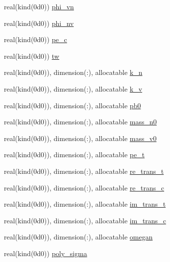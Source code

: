\begin{Indent}
\begin{DoxyCompactItemize}
real(kind(0d0)) \hyperlink{namespacem__global__parameters_acc6771df62005731bbec282b0c9a5659}{phi\+\_\+vn}
\item 
real(kind(0d0)) \hyperlink{namespacem__global__parameters_a7dbd1ec1fd1ece4e997a825fa07785eb}{phi\+\_\+nv}
\item 
real(kind(0d0)) \hyperlink{namespacem__global__parameters_ac1375e5145e018847d9025e83e58b49d}{pe\+\_\+c}
\item 
real(kind(0d0)) \hyperlink{namespacem__global__parameters_aa77b0836fe22478b69e10e656ef7fcc2}{tw}
\item 
real(kind(0d0)), dimension(\+:), allocatable \hyperlink{namespacem__global__parameters_a555eda1318a218d37d1bdd8f4d57eaf2}{k\+\_\+n}
\item 
real(kind(0d0)), dimension(\+:), allocatable \hyperlink{namespacem__global__parameters_a1943ea5a5127e94a197afae57be95758}{k\+\_\+v}
\item 
real(kind(0d0)), dimension(\+:), allocatable \hyperlink{namespacem__global__parameters_a1097b95561b65a9035e5f9218de577f9}{pb0}
\item 
real(kind(0d0)), dimension(\+:), allocatable \hyperlink{namespacem__global__parameters_ae3701f74c9487c9e56c2a11fb6a52e40}{mass\+\_\+n0}
\item 
real(kind(0d0)), dimension(\+:), allocatable \hyperlink{namespacem__global__parameters_a6a06981be6cdab78452a106009022aa4}{mass\+\_\+v0}
\item 
real(kind(0d0)), dimension(\+:), allocatable \hyperlink{namespacem__global__parameters_a8a75928178eef1550c6a0389ff12b44a}{pe\+\_\+t}
\item 
real(kind(0d0)), dimension(\+:), allocatable \hyperlink{namespacem__global__parameters_ae0e61a10cd5b33db394052fbefee2681}{re\+\_\+trans\+\_\+t}
\item 
real(kind(0d0)), dimension(\+:), allocatable \hyperlink{namespacem__global__parameters_a666c8f5f6663ab81f55c2298e642a3a9}{re\+\_\+trans\+\_\+c}
\item 
real(kind(0d0)), dimension(\+:), allocatable \hyperlink{namespacem__global__parameters_a62b213889b2dc5da7d81e7fa636231f6}{im\+\_\+trans\+\_\+t}
\item 
real(kind(0d0)), dimension(\+:), allocatable \hyperlink{namespacem__global__parameters_aa93addd83f0134aaaf319ca2b743233c}{im\+\_\+trans\+\_\+c}
\item 
real(kind(0d0)), dimension(\+:), allocatable \hyperlink{namespacem__global__parameters_ae152b49c742928bc52f6da61dd805693}{omegan}
\item 
real(kind(0d0)) \hyperlink{namespacem__global__parameters_a29164826db891e5662ce2bccdbc57d3c}{poly\+\_\+sigma}
\end{DoxyCompactItemize}
\end{Indent}


